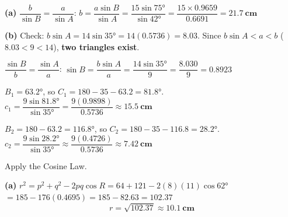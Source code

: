 \documentclass[addpoints]{exam}
\begin{document}
\begin{questions}
\begin{solution}[10cm]
\textbf{(a)} $\dfrac{b}{\sin B} = \dfrac{a}{\sin A}$:\quad
$b = \dfrac{a\sin B}{\sin A} = \dfrac{15\sin\ang{75}}{\sin\ang{42}}
= \dfrac{15 \times 0.9659}{0.6691} = \mathbf{\SI{21.7}{cm}}$

\textbf{(b)} Check: $b\sin A = 14\sin\ang{35} = 14(0.5736) = 8.03$.
Since $b\sin A < a < b$ ($8.03 < 9 < 14$), \textbf{two triangles exist}.

$\dfrac{\sin B}{b} = \dfrac{\sin A}{a}$:\quad
$\sin B = \dfrac{b\sin A}{a} = \dfrac{14\sin\ang{35}}{9} = \dfrac{8.030}{9} = 0.8923$

$B_1 = \ang{63.2}$, so $C_1 = 180 - 35 - 63.2 = \ang{81.8}$.
$c_1 = \dfrac{9\sin\ang{81.8}}{\sin\ang{35}} = \dfrac{9(0.9898)}{0.5736} \approx \mathbf{\SI{15.5}{cm}}$

$B_2 = 180 - 63.2 = \ang{116.8}$, so $C_2 = 180 - 35 - 116.8 = \ang{28.2}$.
$c_2 = \dfrac{9\sin\ang{28.2}}{\sin\ang{35}} \approx \dfrac{9(0.4726)}{0.5736}
\approx \mathbf{\SI{7.42}{cm}}$
\end{solution}

\question Apply the Cosine Law.
\begin{solution}[9cm]
\textbf{(a)} $r^2 = p^2 + q^2 - 2pq\cos R = 64 + 121 - 2(8)(11)\cos\ang{62}$
$= 185 - 176(0.4695) = 185 - 82.63 = 102.37$
\[
r = \sqrt{102.37} \approx \mathbf{\SI{10.1}{cm}}
\]


\end{solution}
\end{questions}
\end{document}
